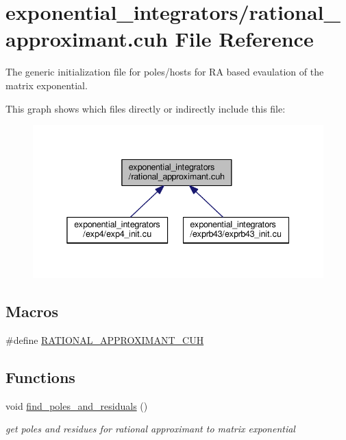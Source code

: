 \hypertarget{rational__approximant_8cuh}{}\section{exponential\+\_\+integrators/rational\+\_\+approximant.cuh File Reference}
\label{rational__approximant_8cuh}


The generic initialization file for poles/hosts for RA based evaulation of the matrix exponential.  


This graph shows which files directly or indirectly include this file\+:\nopagebreak
\begin{figure}[H]
\begin{center}
\leavevmode
\includegraphics[width=338pt]{rational__approximant_8cuh__dep__incl}
\end{center}
\end{figure}
\subsection*{Macros}
\begin{DoxyCompactItemize}
\item 
\#define \hyperlink{rational__approximant_8cuh_a49e3ef1a16cc7452a190cbf970b398ec}{R\+A\+T\+I\+O\+N\+A\+L\+\_\+\+A\+P\+P\+R\+O\+X\+I\+M\+A\+N\+T\+\_\+\+C\+UH}
\end{DoxyCompactItemize}
\subsection*{Functions}
\begin{DoxyCompactItemize}
\item 
void \hyperlink{rational__approximant_8cuh_a1cb9bed79a1ce457c891851da0cec0ba}{find\+\_\+poles\+\_\+and\+\_\+residuals} ()
\begin{DoxyCompactList}\small\item\em get poles and residues for rational approximant to matrix exponential \end{DoxyCompactList}\end{DoxyCompactItemize}


